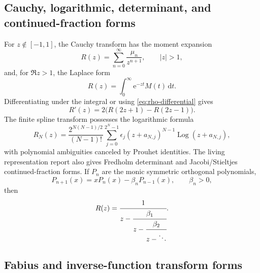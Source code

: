 \documentclass[11pt,oneside]{article}
\theoremstyle{definition}
\newcommand{\dd}{\,\mathrm d}
\newcommand{\ee}{\mathrm e}
\newcommand{\Log}{\operatorname{Log}}
\begin{document}
\subsection{Cauchy, logarithmic, determinant, and continued-fraction forms}

For \(z\notin[-1,1]\), the Cauchy transform has the moment expansion
\begin{equation}
 R(z)=\sum_{n=0}^{\infty}\frac{\mu_n}{z^{n+1}},\qquad |z|>1,
 \label{eq:R-moment-series}
\end{equation}
and, for \(\Re z>1\), the Laplace form
\begin{equation}
 R(z)=\int_0^{\infty}\ee^{-zt}M(t)\dd t.
 \label{eq:R-Laplace}
\end{equation}
Differentiating under the integral or using \eqref{eq:rho-differential} gives
\begin{equation}
 R'(z)=2\bigl(R(2z+1)-R(2z-1)\bigr).
 \label{eq:R-differential}
\end{equation}
The finite spline transform possesses the logarithmic formula
\begin{equation}
 R_N(z)=\frac{2^{N(N-1)/2}}{(N-1)!}
 \sum_{j=0}^{2^N-1}\epsilon_j
 (z+a_{N,j})^{N-1}\Log(z+a_{N,j}),
 \label{eq:finite-log-resolvent}
\end{equation}
with polynomial ambiguities canceled by Prouhet identities. The living representation
report also gives Fredholm determinant and Jacobi/Stieltjes continued-fraction forms. If
\(P_n\) are the monic symmetric orthogonal polynomials,
\begin{equation}
 P_{n+1}(x)=xP_n(x)-\beta_nP_{n-1}(x),\qquad \beta_n>0,
 \label{eq:Jacobi-recurrence}
\end{equation}
then
\begin{equation}
 R(z)=\cfrac{1}{z-\cfrac{\beta_1}{z-\cfrac{\beta_2}{z-\ddots}}}.
 \label{eq:Jacobi-CF}
\end{equation}

\subsection{Fabius and inverse-function transform forms}
\end{document}
